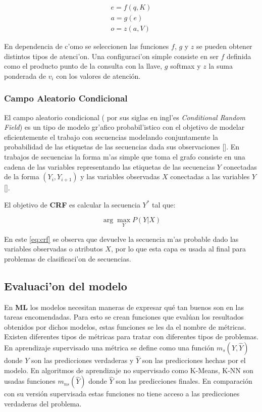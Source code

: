 \begin{equation}
	\begin{align}
		e = f(q, K) \\
		a = g(e) \\ 
		o = z(a, V)
	\end{align}
\end{equation}

En dependencia de c'omo se seleccionen las funciones $f$, $g$ y $z$ se pueden obtener distintos tipos de atenci'on.
Una configuraci'on simple consiste en ser $f$ definida como el producto punto de la consulta con la llave,
$g$ softmax y $z$ la suma ponderada de $v_i$ con los valores de atención. 

\subsubsection{Campo Aleatorio Condicional}


El campo aleatorio condicional ( por sus siglas en ingl'es \emph{Conditional Random Field}) es un 
tipo de modelo gr'afico probabil'istico con el objetivo de modelar eficientemente el trabajo con secuencias 
modelando conjuntamente la probabilidad de las etiquetas de las secuencias dada sus observaciones [\cite{lafferty2001conditional}].
En trabajos de secuencias la forma m'as simple que toma el grafo consiste en una cadena de las variables representando
las etiquetas de las secuencias $Y$ conectadas de la forma $(Y_i, Y_{i+1})$ y las variables observadas $X$ conectadas
a las variables $Y$ [\cite{wallach2004conditional}].

El objetivo de \textbf{CRF} es calcular la secuencia $Y^*$ tal que:

\begin{equation}
	\arg \max_Y P(Y | X)
\end{equation}\label{eq:crf}

En este \ref{eq:crf} se observa que devuelve la secuencia m'as probable dado las variables observadas o atributos $X$,
por lo que esta capa es usada al final para problemas de clasificaci'on de secuencias.

\subsection{Evaluaci'on del modelo}

En \textbf{ML} los modelos necesitan maneras de expresar qué tan buenos son 
en las tareas encomendadas. Para esto se crean funciones que evalúan los resultados obtenidos
por dichos modelos, estas funciones se les da el nombre de métricas. Existen diferentes tipos de
métricas para tratar con diferentes tipos de problemas. En aprendizaje supervisado una métrica se
define como una función $m_s(Y, \hat{Y})$ donde $Y$ son las predicciones verdaderas y $\hat{Y}$ son las predicciones
hechas por el modelo. En algoritmos de aprendizaje no supervisado como K-Means, K-NN son usadas funciones $m_{ns}(\hat{Y})$
donde $\hat{Y}$ son las predicciones finales. En comparación con su versión supervisada estas funciones no tiene acceso
a las predicciones verdaderas del problema.

